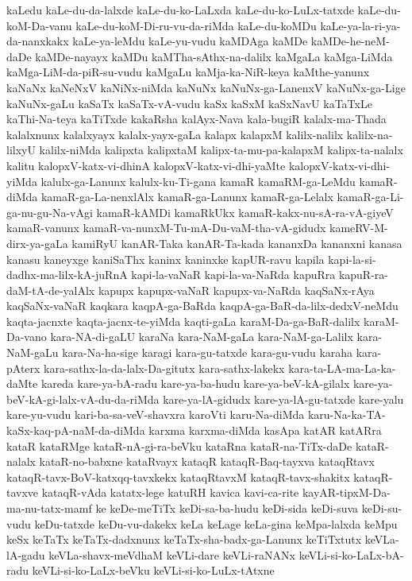 {kaLedu
kaLe-du-da-lalxde
kaLe-du-ko-LaLxda
kaLe-du-ko-LuLx-tatxde
kaLe-du-koM-Da-vanu
kaLe-du-koM-Di-ru-vu-da-riMda
kaLe-du-koMDu
kaLe-ya-la-ri-ya-da-nanxkakx
kaLe-ya-leMdu
kaLe-yu-vudu
kaMDAga
kaMDe
kaMDe-he-neM-daDe
kaMDe-nayayx
kaMDu
kaMTha-sAthx-na-dalilx
kaMgaLa
kaMga-LiMda
kaMga-LiM-da-piR-su-vudu
kaMgaLu
kaMja-ka-NiR-keya
kaMthe-yanunx
kaNaNx
kaNeNxV
kaNiNx-niMda
kaNuNx
kaNuNx-ga-LanenxV
kaNuNx-ga-Lige
kaNuNx-gaLu
kaSaTx
kaSaTx-vA-vudu
kaSx
kaSxM
kaSxNavU
kaTaTxLe
kaThi-Na-teya
kaTiTxde
kakaRsha
kalAyx-Nava
kala-bugiR
kalalx-ma-Thada
kalalxnunx
kalalxyayx
kalalx-yayx-gaLa
kalapx
kalapxM
kalilx-nalilx
kalilx-na-lilxyU
kalilx-niMda
kalipxta
kalipxtaM
kalipx-ta-mu-pa-kalapxM
kalipx-ta-nalalx
kalitu
kalopxV-katx-vi-dhinA
kalopxV-katx-vi-dhi-yaMte
kalopxV-katx-vi-dhi-yiMda
kalulx-ga-Lanunx
kalulx-ku-Ti-gana
kamaR
kamaRM-ga-LeMdu
kamaR-diMda
kamaR-ga-La-nenxlAlx
kamaR-ga-Lanunx
kamaR-ga-Lelalx
kamaR-ga-Li-ga-nu-gu-Na-vAgi
kamaR-kAMDi
kamaRkUkx
kamaR-kakx-nu-sA-ra-vA-giyeV
kamaR-vanunx
kamaR-va-nunxM-Tu-mA-Du-vaM-tha-vA-gidudx
kameRV-M-dirx-ya-gaLa
kamiRyU
kanAR-Taka
kanAR-Ta-kada
kananxDa
kananxni
kanasa
kanasu
kaneyxge
kaniSaThx
kaninx
kaninxke
kapUR-ravu
kapila
kapi-la-si-dadhx-ma-lilx-kA-juRnA
kapi-la-vaNaR
kapi-la-va-NaRda
kapuRra
kapuR-ra-daM-tA-de-yalAlx
kapupx
kapupx-vaNaR
kapupx-va-NaRda
kaqSaNx-rAya
kaqSaNx-vaNaR
kaqkara
kaqpA-ga-BaRda
kaqpA-ga-BaR-da-lilx-dedxV-neMdu
kaqta-jacnxte
kaqta-jacnx-te-yiMda
kaqti-gaLa
karaM-Da-ga-BaR-dalilx
karaM-Da-vano
kara-NA-di-gaLU
karaNa
kara-NaM-gaLa
kara-NaM-ga-Lalilx
kara-NaM-gaLu
kara-Na-ha-sige
karagi
kara-gu-tatxde
kara-gu-vudu
karaha
kara-pAterx
kara-sathx-la-da-lalx-Da-gitutx
kara-sathx-lakekx
kara-ta-LA-ma-La-ka-daMte
kareda
kare-ya-bA-radu
kare-ya-ba-hudu
kare-ya-beV-kA-gilalx
kare-ya-beV-kA-gi-lalx-vA-du-da-riMda
kare-ya-lA-gidudx
kare-ya-lA-gu-tatxde
kare-yalu
kare-yu-vudu
kari-ba-sa-veV-shavxra
karoVti
karu-Na-diMda
karu-Na-ka-TA-kaSx-kaq-pA-naM-da-diMda
karxma
karxma-diMda
kasApa
katAR
katARra
kataR
kataRMge
kataR-nA-gi-ra-beVku
kataRna
kataR-na-TiTx-daDe
kataR-nalalx
kataR-no-babxne
kataRvayx
kataqR
kataqR-Baq-tayxva
kataqRtavx
kataqR-tavx-BoV-katxqq-tavxkekx
kataqRtavxM
kataqR-tavx-shakitx
kataqR-tavxve
kataqR-vAda
katatx-lege
katuRH
kavica
kavi-ca-rite
kayAR-tipxM-Da-ma-nu-tatx-mamf
ke
keDe-meTiTx
keDi-sa-ba-hudu
keDi-sida
keDi-suva
keDi-su-vudu
keDu-tatxde
keDu-vu-dakekx
keLa
keLage
keLa-gina
keMpa-lalxda
keMpu
keSx
keTaTx
keTaTx-dadxnunx
keTaTx-sha-badx-ga-Lanunx
keTiTxtutx
keVLa-lA-gadu
keVLa-shavx-meVdhaM
keVLi-dare
keVLi-raNANx
keVLi-si-ko-LaLx-bA-radu
keVLi-si-ko-LaLx-beVku
keVLi-si-ko-LuLx-tAtxne
}

